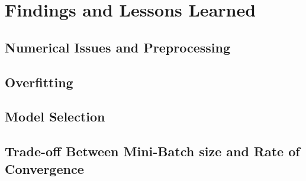 \documentclass[twoside,12pt]{article}
\begin{document}
\section{Findings and Lessons Learned}
\subsection{Numerical Issues and Preprocessing}
\subsection{Overfitting}
\subsection{Model Selection}
\subsection{Trade-off Between Mini-Batch size and Rate of Convergence}
\end{document}

